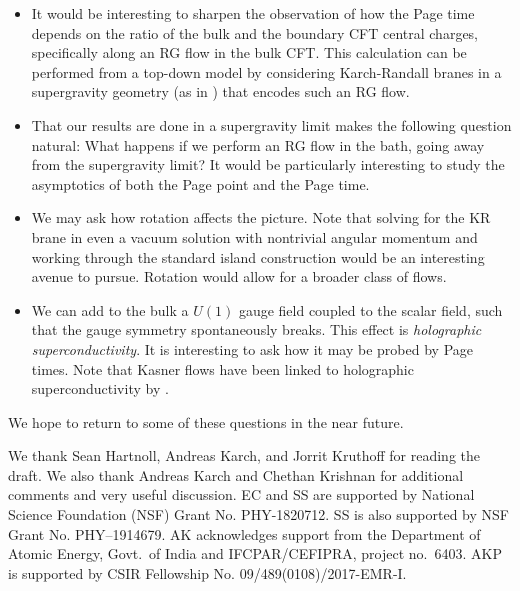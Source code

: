 \documentclass[12pt,a4paper]{article}
\begin{document}
\begin{itemize}
\item It would be interesting to sharpen the observation of how the Page time depends on the ratio of the bulk and the boundary CFT central charges, specifically along an RG flow in the bulk CFT. This calculation can be performed from a top-down model by considering Karch-Randall branes in a supergravity geometry (as in \cite{Uhlemann:2021nhu}) that encodes such an RG flow.

\item That our results are done in a supergravity limit makes the following question natural: What happens if we perform an RG flow in the bath, going away from the supergravity limit? It would be particularly interesting to study the asymptotics of both the Page point and the Page time.

\item We may ask how rotation affects the picture. Note that solving for the KR brane in even a vacuum solution with nontrivial angular momentum and working through the standard island construction would be an interesting avenue to pursue. Rotation would allow for a broader class of flows.

\item We can add to the bulk a $U(1)$ gauge field coupled to the scalar field, such that the gauge symmetry spontaneously breaks. This effect is \textit{holographic superconductivity}. It is interesting to ask how it may be probed by Page times. Note that Kasner flows have been linked to holographic superconductivity by \cite{Hartnoll:2020fhc}.
\end{itemize}
We hope to return to some of these questions in the near future. 

\acknowledgments
We thank Sean Hartnoll, Andreas Karch, and Jorrit Kruthoff for reading the draft. We also thank Andreas Karch and Chethan Krishnan for additional comments and very useful discussion. EC and SS are supported by National Science Foundation (NSF) Grant No. PHY-1820712. SS is also supported by NSF Grant No. PHY–1914679. AK acknowledges support from the Department of Atomic Energy, Govt.~of India and IFCPAR/CEFIPRA, project no.~6403. AKP is supported by CSIR Fellowship No. 09/489(0108)/2017-EMR-I.

\end{document}
